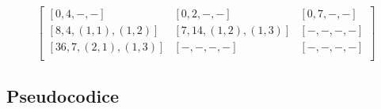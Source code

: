 \[
	\begin{bmatrix}
		[0, 4, -, -]            & [0, 2, -, -]            & [0, 7, -, -] \\
		[8, 4, (1, 1), (1, 2)]  & [7, 14, (1, 2), (1, 3)] & [-, -, -, -] \\
		[36, 7, (2, 1), (1, 3)] & [-, -, -, -]            & [-, -, -, -] \\
	\end{bmatrix}
\]



\subsection{Pseudocodice}